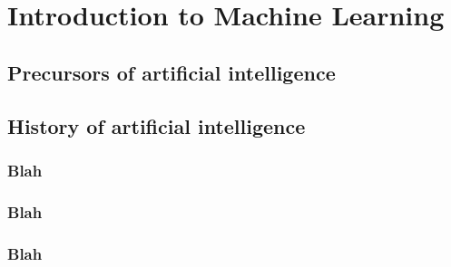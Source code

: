 \renewcommand{\prevpart}{0 }
\renewcommand{\thispart}{1 }
\renewcommand{\nextpart}{2 }

\section{Introduction to Machine Learning}







% 



\subsection{Precursors of artificial intelligence}


\subsection{History of artificial intelligence}
\subsubsection{Blah}
\subsubsection{Blah}
\subsubsection{Blah}
